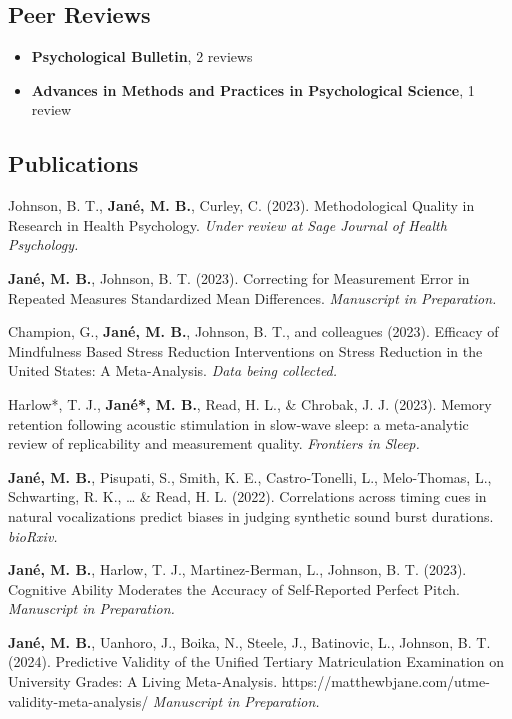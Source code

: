 \documentclass[
  letterpaper,
  DIV=11,
  numbers=noendperiod]{scrartcl}
\providecommand{\tightlist}{%
  \setlength{\itemsep}{0pt}\setlength{\parskip}{0pt}}\usepackage{longtable,booktabs,array}
\begin{document}
\subsection{\texorpdfstring{ Peer
Reviews}{ Peer Reviews}}\label{peer-reviews}

\begin{itemize}
\tightlist
\item
  \textbf{Psychological Bulletin}, 2 reviews
\item
  \textbf{Advances in Methods and Practices in Psychological Science}, 1
  review
\end{itemize}

\subsection{\texorpdfstring{
Publications}{ Publications}}\label{publications}

Johnson, B. T., \textbf{Jané, M. B.}, Curley, C. (2023). Methodological
Quality in Research in Health Psychology. \emph{Under review at Sage
Journal of Health Psychology.}

\textbf{Jané, M. B.}, Johnson, B. T. (2023). Correcting for Measurement
Error in Repeated Measures Standardized Mean Differences.
\emph{Manuscript in Preparation.}

Champion, G., \textbf{Jané, M. B.}, Johnson, B. T., and colleagues
(2023). Efficacy of Mindfulness Based Stress Reduction Interventions on
Stress Reduction in the United States: A Meta-Analysis. \emph{Data being
collected.}

Harlow*, T. J., \textbf{Jané*, M. B.}, Read, H. L., \& Chrobak, J. J.
(2023). Memory retention following acoustic stimulation in slow-wave
sleep: a meta-analytic review of replicability and measurement quality.
\emph{Frontiers in Sleep.}

\textbf{Jané, M. B.}, Pisupati, S., Smith, K. E., Castro-Tonelli, L.,
Melo-Thomas, L., Schwarting, R. K., \ldots{} \& Read, H. L. (2022).
Correlations across timing cues in natural vocalizations predict biases
in judging synthetic sound burst durations. \emph{bioRxiv.}

\textbf{Jané, M. B.}, Harlow, T. J., Martinez-Berman, L., Johnson, B. T.
(2023). Cognitive Ability Moderates the Accuracy of Self-Reported
Perfect Pitch. \emph{Manuscript in Preparation.}

\textbf{Jané, M. B.}, Uanhoro, J., Boika, N., Steele, J., Batinovic, L.,
Johnson, B. T. (2024). Predictive Validity of the Unified Tertiary
Matriculation Examination on University Grades: A Living Meta-Analysis.
https://matthewbjane.com/utme-validity-meta-analysis/ \emph{Manuscript
in Preparation.}
\end{document}
